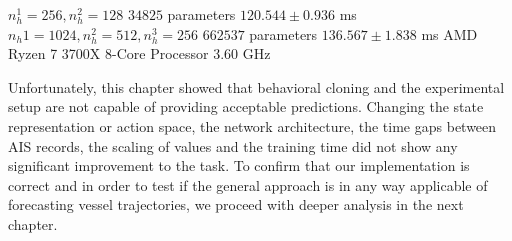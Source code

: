\par
$n_h^1=256, n_h^2=128$ $34825$ parameters $120.544 \pm 0.936$ ms
$n_h1=1024, n_h^2=512, n_h^3=256$ $662537$ parameters $136.567 \pm 1.838$ ms
AMD Ryzen 7 3700X 8-Core Processor 3.60 GHz
\par
Unfortunately, this chapter showed that behavioral cloning and the experimental setup are not capable of providing acceptable predictions.
Changing the state representation or action space, the network architecture, the time gaps between AIS records, the scaling of values and the training time did not show any significant improvement to the task. To confirm that our implementation is correct and in order to test if the general approach is in any way applicable of forecasting vessel trajectories, we proceed with deeper analysis in the next chapter. 